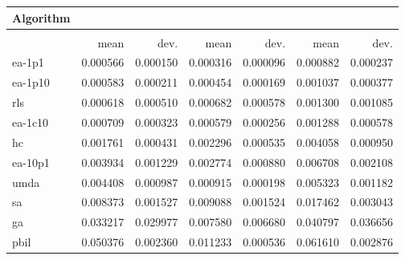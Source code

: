 \begin{tabular}{@{} l *{6}{>{{}}N{1}{2}} @{}}
\toprule
{Algorithm} &  \\
\midrule
&  &  &  \\
\midrule
& {mean} & {dev.} & {mean} & {dev.} & {mean} & {dev.} \\
\midrule
ea-1p1 & 0.000566 & 0.000150 & 0.000316 & 0.000096 & 0.000882 & 0.000237 \\
ea-1p10 & 0.000583 & 0.000211 & 0.000454 & 0.000169 & 0.001037 & 0.000377 \\
rls & 0.000618 & 0.000510 & 0.000682 & 0.000578 & 0.001300 & 0.001085 \\
ea-1c10 & 0.000709 & 0.000323 & 0.000579 & 0.000256 & 0.001288 & 0.000578 \\
hc & 0.001761 & 0.000431 & 0.002296 & 0.000535 & 0.004058 & 0.000950 \\
ea-10p1 & 0.003934 & 0.001229 & 0.002774 & 0.000880 & 0.006708 & 0.002108 \\
umda & 0.004408 & 0.000987 & 0.000915 & 0.000198 & 0.005323 & 0.001182 \\
sa & 0.008373 & 0.001527 & 0.009088 & 0.001524 & 0.017462 & 0.003043 \\
ga & 0.033217 & 0.029977 & 0.007580 & 0.006680 & 0.040797 & 0.036656 \\
pbil & 0.050376 & 0.002360 & 0.011233 & 0.000536 & 0.061610 & 0.002876 \\
\bottomrule
\end{tabular}
